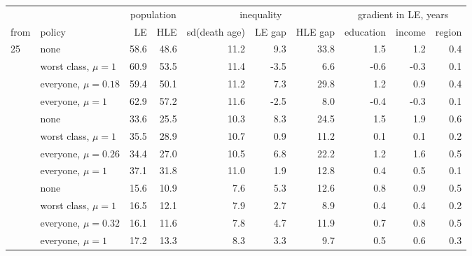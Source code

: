 \begin{tabular}{llrrrrrrrr}
\toprule
 & & \multicolumn{2}{c}{population} & \multicolumn{3}{c}{inequality} & \multicolumn{3}{c}{gradient in LE, years} \\
\cmidrule(lr){3-4} \cmidrule(lr){5-7} \cmidrule(lr){8-10}
from & policy & LE & HLE & sd(death age) & LE gap & HLE gap & education & income & region \\
\midrule
25 & none & 58.6 & 48.6 & 11.2 & 9.3 & 33.8 & 1.5 & 1.2 & 0.4 \\
 & worst class, $\mu=1$ & 60.9 & 53.5 & 11.4 & -3.5 & 6.6 & -0.6 & -0.3 & 0.1 \\
 & everyone, $\mu=0.18$ & 59.4 & 50.1 & 11.2 & 7.3 & 29.8 & 1.2 & 0.9 & 0.4 \\
 & everyone, $\mu=1$ & 62.9 & 57.2 & 11.6 & -2.5 & 8.0 & -0.4 & -0.3 & 0.1 \\
\addlinespace
50 & none & 33.6 & 25.5 & 10.3 & 8.3 & 24.5 & 1.5 & 1.9 & 0.6 \\
 & worst class, $\mu=1$ & 35.5 & 28.9 & 10.7 & 0.9 & 11.2 & 0.1 & 0.1 & 0.2 \\
 & everyone, $\mu=0.26$ & 34.4 & 27.0 & 10.5 & 6.8 & 22.2 & 1.2 & 1.6 & 0.5 \\
 & everyone, $\mu=1$ & 37.1 & 31.8 & 11.0 & 1.9 & 12.8 & 0.4 & 0.5 & 0.1 \\
\addlinespace
70 & none & 15.6 & 10.9 & 7.6 & 5.3 & 12.6 & 0.8 & 0.9 & 0.5 \\
 & worst class, $\mu=1$ & 16.5 & 12.1 & 7.9 & 2.7 & 8.9 & 0.4 & 0.4 & 0.2 \\
 & everyone, $\mu=0.32$ & 16.1 & 11.6 & 7.8 & 4.7 & 11.9 & 0.7 & 0.8 & 0.5 \\
 & everyone, $\mu=1$ & 17.2 & 13.3 & 8.3 & 3.3 & 9.7 & 0.5 & 0.6 & 0.3 \\
\bottomrule
\end{tabular}
